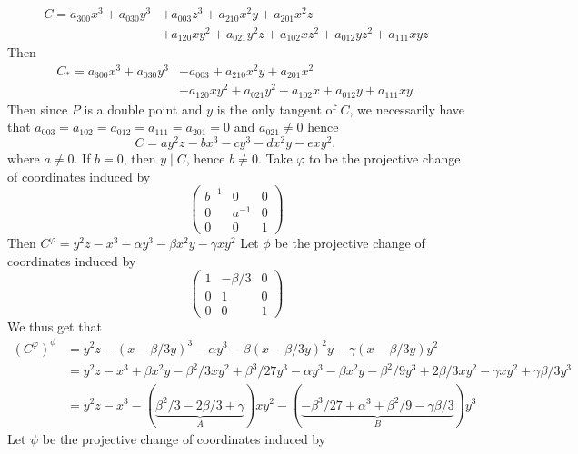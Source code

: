 \begin{example}
\begin{enumerate}
            \begin{align*} 
                C=a_{300} x^3+a_{030}y^3&+a_{003}z^3+a_{210}x^2y+a_{201}x^2z\\&+ a_{120}xy^2+a_{021}y^2z+a_{102}xz^2+a_{012}yz^2+a_{111}xyz
            \end{align*}
            Then 
            \begin{align*} 
                C_\ast = a_{300} x^3+a_{030}y^3&+a_{003}+a_{210}x^2y+a_{201}x^2\\&+ a_{120}xy^2+a_{021}y^2+a_{102}x+a_{012}y+a_{111}xy.
            \end{align*}
            Then since $P$ is a double point and $y$ is the only tangent of $C$, we necessarily have that $a_{003}=a_{102}=a_{012}=a_{111}=a_{201}=0$ and $a_{021}\neq 0$ hence 
            $$C= ay^2z-bx^3-cy^3-dx^2y-exy^2,$$
            where $a\neq 0$. If $b=0$, then $y\mid C$, hence $b\neq 0$. Take $\varphi$ to be the projective change of coordinates induced by 
            $$
                \begin{pmatrix}
                    b^{-1} & 0 & 0\\
                    0 & a^{-1} & 0\\
                    0 & 0 & 1
                \end{pmatrix}
            $$
            Then $C^\varphi = y^2z-x^3-\alpha y^3-\beta x^2y-\gamma xy^2$
            Let $\phi$ be the projective change of coordinates induced by 
            $$
                \begin{pmatrix}
                    1 & -\beta/3 & 0\\
                    0 & 1 & 0\\
                    0 & 0 & 1
                \end{pmatrix}
            $$
            We thus get that 
            \begin{align*}
                (C^\varphi)^\phi &= y^2z-(x-\beta/3y)^3-\alpha y^3-\beta(x-\beta/3y)^2y-\gamma(x-\beta/3y)y^2\\
                &=  y^2z - x^3+\beta x^2y-\beta^2/3xy^2+\beta^3/27y^3-\alpha y^3-\beta x^2y-\beta^2/9y^3+2\beta/3xy^2-\gamma xy^2+\gamma\beta/3y^3\\
                &= y^2z-x^3-(\underbrace{\beta^2/3 -2\beta/3 +\gamma}_{A})xy^2-(\underbrace{-\beta^3/27+\alpha^3+\beta^2/9-\gamma\beta/3}_{B})y^3
            \end{align*}
            Let $\psi$ be the projective change of coordinates induced by 
            $$
$$
\end{enumerate}
\end{example}
